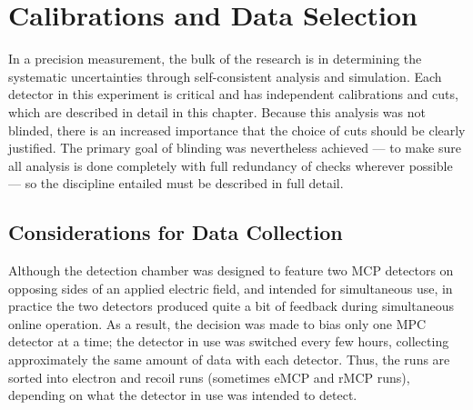 %
%
%
\clearpage
\chapter{Calibrations and Data Selection}
\label{calibrations_chapter}
\label{dataselection_chapter}
In a precision measurement, the bulk of the research is in determining the systematic uncertainties through self-consistent analysis and simulation.  Each detector in this experiment is critical and has independent calibrations and cuts, which are described in detail in this chapter.  Because this analysis was not blinded, there is an increased importance that the choice of cuts should be clearly justified.  The primary goal of blinding was nevertheless achieved --- to make sure all analysis is done completely with full redundancy of checks wherever possible --- so the discipline entailed must be described in full detail.


\section{Considerations for Data Collection}
\label{sec:dataconsiderations}
Although the detection chamber was designed to feature two \ac{MCP} detectors on opposing sides of an applied electric field, and intended for simultaneous use, in practice the two detectors produced quite a bit of feedback during simultaneous online operation.  %
As a result, the decision was made to bias only one MPC detector at a time;  the detector in use was switched every few hours, collecting approximately the same amount of data with each detector.  Thus, the runs are sorted into electron and recoil runs (sometimes \ac{eMCP} and \ac{rMCP} runs), depending on what the detector in use was intended to detect.  



